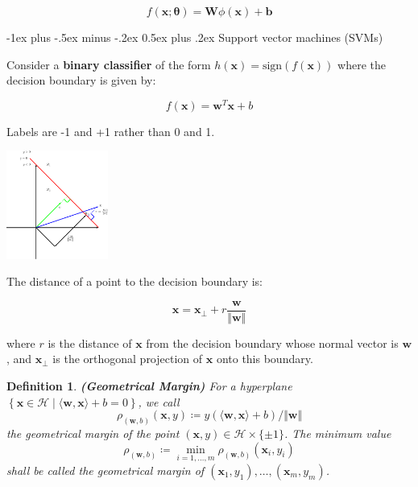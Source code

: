 \documentclass[10pt,landscape]{article}
\makeatletter
\newtheorem*{definition*}{Definition}
\renewcommand{\section}{\@startsection{section}{1}{0mm}%
                                {-1ex plus -.5ex minus -.2ex}%
                                {0.5ex plus .2ex}%
                                {\normalfont\large\bfseries}}
\makeatother
\begin{document}
\begin{multicols}{3}
\begin{equation*}
\boxed{f \left( \mathbf{x}; \mathbf{\theta} \right) = \mathbf{W}\phi \left( \mathbf{x} \right) + \mathbf{b}}
\end{equation*}

\section{Support vector machines (SVMs)}

Consider a \textbf{binary classifier} of the form  $h(\mathbf{x})=\textrm{sign}\left(f(\mathbf{x})\right)$ where the decision boundary is given by:

\begin{equation*}
f(\mathbf{x}) = \mathbf{w}^{T}\mathbf{x} + b
\end{equation*}

Labels are -1 and +1 rather than 0 and 1.

\includegraphics[width=0.25\textwidth]{Figure_17.13_A.png}

The distance of a point to the decision boundary is:

\begin{equation*}
\mathbf{x} = \mathbf{x}_{\bot} + r\frac{\mathbf{w}}{\Vert \mathbf{w} \Vert}
\end{equation*}

where $r$ is the distance of $\mathbf{x}$ from the decision boundary whose normal vector is $\mathbf{w}$, and $\mathbf{x}_{\bot}$ is the orthogonal projection of $\mathbf{x}$ onto this boundary.

\begin{definition*}
\textbf{(Geometrical Margin)} For a hyperplane $\left\lbrace \mathbf{x} \in \mathcal{H} \mid \langle\mathbf{w}, \mathbf{x}\rangle + b = 0 \right\rbrace$, we call
\begin{equation*}
\rho_{(\mathbf{w}, b)} (\mathbf{x}, y) \coloneqq y \left( \langle \mathbf{w}, \mathbf{x} \rangle + b \right)/ \Vert \mathbf{w} \Vert
\end{equation*}
the geometrical margin of the point $(\mathbf{x},y) \in \mathcal{H} \times \lbrace \pm 1 \rbrace$. The minimum value 
\begin{equation*}
\rho_{(\mathbf{w}, b)} \coloneqq \min_{i=1,\dots,m} \rho_{(\mathbf{w}, b)} (\mathbf{x}_i, y_i)
\end{equation*}
shall be called the geometrical margin of $(\mathbf{x}_1, y_1), \dots, (\mathbf{x}_m, y_m)$.
\end{definition*}



\end{multicols}
\end{document}
